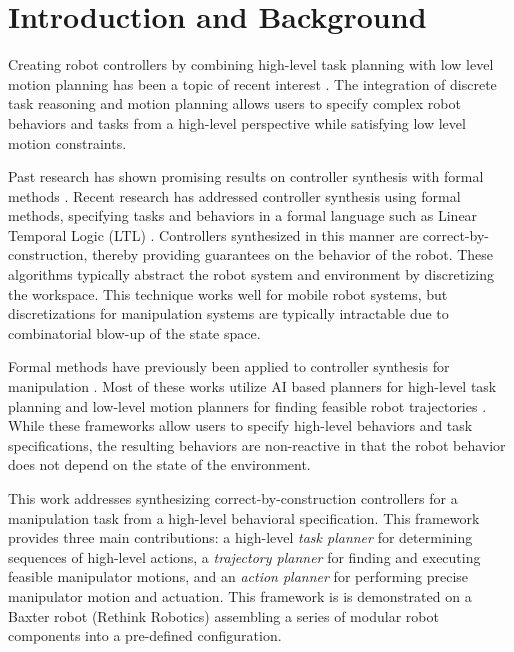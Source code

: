 \section{Introduction and Background}


Creating robot controllers by combining high-level task planning with low level motion planning has been a topic of recent interest \cite{HKG2009,Belta2008,Bhatia2011,Dornhege2009,Erdem2011,Tom2014,Srivastava2014}.
The integration of discrete task reasoning and motion planning allows users to specify complex robot behaviors and tasks from a high-level perspective while satisfying low level motion constraints.

Past research has shown promising results on controller synthesis with formal methods \cite{HKG2009,Belta2008,Bhatia2011,Wongpiromsarn,Maly,Vasile}.
Recent research has addressed controller synthesis using formal methods, specifying tasks and behaviors in a formal language such as Linear Temporal Logic (LTL) \cite{HKG2009,Belta2008,Bhatia2011,Dornhege2009,Erdem2011,Tom2014,Srivastava2014}.
Controllers synthesized in this manner are correct-by-construction, thereby providing guarantees on the behavior of the robot.
These algorithms typically abstract the robot system and environment by discretizing the workspace.
This technique works well for mobile robot systems, but discretizations for manipulation systems are typically intractable due to combinatorial blow-up of the state space.

Formal methods have previously been applied to controller synthesis for manipulation \cite{Dornhege2009,Erdem2011,Tom2014,Srivastava2014,CambonAG09,KaelblingL11,PlakuH10,HeLKV15}.
Most of these works utilize AI based planners for high-level task planning and low-level motion planners for finding feasible robot trajectories \cite{Nau,Hoffmann01}.
While these frameworks allow users to specify high-level behaviors and task specifications, the resulting behaviors are non-reactive in that the robot behavior does not depend on the state of the environment.

This work addresses synthesizing correct-by-construction controllers for a manipulation task from a high-level behavioral specification.
This framework provides three main contributions: a high-level {\it task planner} for determining sequences of high-level actions, a {\it trajectory planner} for finding and executing feasible manipulator motions, and an {\it action planner} for performing precise manipulator motion and actuation.
This framework is is demonstrated on a Baxter robot (Rethink Robotics) assembling a series of modular robot components into a pre-defined configuration. 


